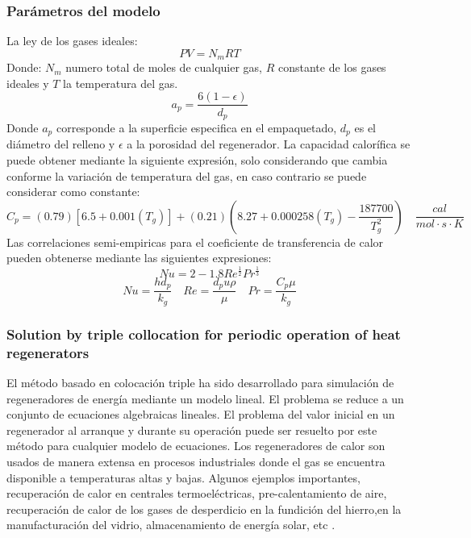 \documentclass[12pt,letterpaper,final]{article}%
\begin{document}
\subsubsection*{Parámetros del modelo}
La ley de los gases ideales:
\begin{equation}
	PV=N_m R T
\end{equation}
Donde: $N_m$ numero total de moles de cualquier gas, $R$ constante de los gases ideales y $T$ la temperatura del gas.
\begin{equation}
	a_p=\frac{6(1-\epsilon)}{d_p}
\end{equation}
Donde $a_p$ corresponde a la superficie especifica en el empaquetado, $d_p$ es el diámetro del relleno y $\epsilon$ a la porosidad del regenerador. 
\newline
La capacidad calorífica se puede obtener mediante la siguiente expresión, solo considerando que cambia conforme la variación de temperatura del gas\cite{green2018perry}, en caso contrario se puede considerar como constante:
\begin{equation}
	C_p=(0.79)[6.5+0.001(T_g)] + (0.21)(8.27+0.000258(T_g)-\frac{187700}{T_g^2}) \quad \frac{cal}{mol\cdot s \cdot K}
	\end{equation}
Las correlaciones semi-empiricas para el coeficiente de transferencia de calor pueden obtenerse mediante las siguientes expresiones\cite{Levenspiel1983}:
\begin{equation}
	Nu = 2 - 1.8 Re^{\frac{1}{2}}Pr^{\frac{1}{3}}
\end{equation}
\begin{equation*}
	Nu = \frac{hd_p}{k_g} \quad Re = \frac{d_p u\rho}{\mu} \quad Pr=\frac{C_p \mu }{k_g}
\end{equation*}

\subsubsection*{Solution by triple collocation for periodic operation of heat regenerators}

El método basado en colocación triple ha sido desarrollado para simulación de regeneradores de energía mediante un modelo lineal. El problema se reduce a un conjunto de ecuaciones algebraicas lineales. El problema del valor inicial en un regenerador al arranque y durante su operación puede ser resuelto por este método para cualquier modelo de ecuaciones. 
\newline
Los regeneradores de calor son usados de manera extensa en procesos industriales donde el gas se encuentra disponible a temperaturas altas y bajas. Algunos ejemplos importantes, recuperación de calor en centrales termoeléctricas, pre-calentamiento de aire, recuperación de calor de los gases de desperdicio en la fundición del hierro,en la manufacturación del vidrio, almacenamiento de energía solar, etc \cite{Ramachadran1984}.
\newline
\end{document}
